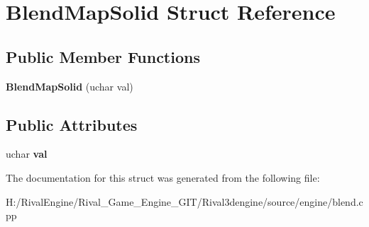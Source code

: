 \hypertarget{struct_blend_map_solid}{}\section{Blend\+Map\+Solid Struct Reference}
\label{struct_blend_map_solid}
\subsection*{Public Member Functions}
\begin{DoxyCompactItemize}
\item 
\mbox{\label{struct_blend_map_solid_a98bce9b25af361c3d726078bfa8625fd}} 
{\bfseries Blend\+Map\+Solid} (uchar val)
\end{DoxyCompactItemize}
\subsection*{Public Attributes}
\begin{DoxyCompactItemize}
\item 
\mbox{\label{struct_blend_map_solid_a45364c3517a30d9068f8ce8368b63879}} 
uchar {\bfseries val}
\end{DoxyCompactItemize}


The documentation for this struct was generated from the following file\+:\begin{DoxyCompactItemize}
\item 
H\+:/\+Rival\+Engine/\+Rival\+\_\+\+Game\+\_\+\+Engine\+\_\+\+G\+I\+T/\+Rival3dengine/source/engine/blend.\+cpp\end{DoxyCompactItemize}
